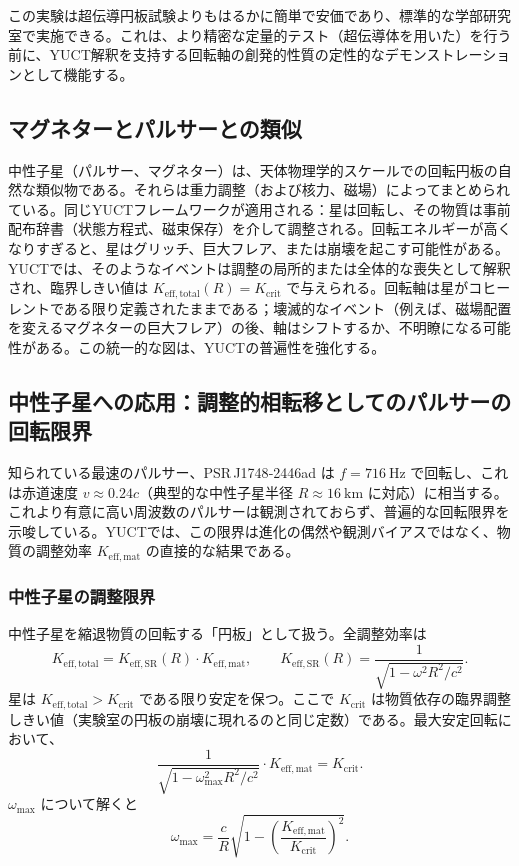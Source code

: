 \documentclass[12pt,a4paper]{article}
\newcommand{\Kefftot}{K_{\mathrm{eff,total}}}
\newcommand{\Kcrit}{K_{\mathrm{crit}}}
\begin{document}
	この実験は超伝導円板試験よりもはるかに簡単で安価であり、標準的な学部研究室で実施できる。これは、より精密な定量的テスト（超伝導体を用いた）を行う前に、YUCT解釈を支持する回転軸の創発的性質の定性的なデモンストレーションとして機能する。
	
	\subsection{マグネターとパルサーとの類似}
	
	中性子星（パルサー、マグネター）は、天体物理学的スケールでの回転円板の自然な類似物である。それらは重力調整（および核力、磁場）によってまとめられている。同じYUCTフレームワークが適用される：星は回転し、その物質は事前配布辞書（状態方程式、磁束保存）を介して調整される。回転エネルギーが高くなりすぎると、星はグリッチ、巨大フレア、または崩壊を起こす可能性がある。YUCTでは、そのようなイベントは調整の局所的または全体的な喪失として解釈され、臨界しきい値は \(\Kefftot(R) = \Kcrit\) で与えられる。回転軸は星がコヒーレントである限り定義されたままである；壊滅的なイベント（例えば、磁場配置を変えるマグネターの巨大フレア）の後、軸はシフトするか、不明瞭になる可能性がある。この統一的な図は、YUCTの普遍性を強化する。
	
	\subsection{中性子星への応用：調整的相転移としてのパルサーの回転限界}
	
	知られている最速のパルサー、PSR J1748‑2446ad は \(f = 716\ \text{Hz}\) で回転し、これは赤道速度 \(v \approx 0.24c\)（典型的な中性子星半径 \(R\approx 16\ \text{km}\) に対応）に相当する。これより有意に高い周波数のパルサーは観測されておらず、普遍的な回転限界を示唆している。YUCTでは、この限界は進化の偶然や観測バイアスではなく、物質の調整効率 \(K_{\mathrm{eff,mat}}\) の直接的な結果である。
	
	\subsubsection{中性子星の調整限界}
	
	中性子星を縮退物質の回転する「円板」として扱う。全調整効率は
	\[
	K_{\mathrm{eff,total}} = K_{\mathrm{eff,SR}}(R) \cdot K_{\mathrm{eff,mat}},
	\qquad
	K_{\mathrm{eff,SR}}(R) = \frac{1}{\sqrt{1 - \omega^2 R^2/c^2}}.
	\]
	星は \(K_{\mathrm{eff,total}} > K_{\mathrm{crit}}\) である限り安定を保つ。ここで \(K_{\mathrm{crit}}\) は物質依存の臨界調整しきい値（実験室の円板の崩壊に現れるのと同じ定数）である。最大安定回転において、
	\[
	\frac{1}{\sqrt{1 - \omega_{\max}^2 R^2/c^2}} \cdot K_{\mathrm{eff,mat}} = K_{\mathrm{crit}}.
	\]
	\(\omega_{\max}\) について解くと
	\[
	\omega_{\max} = \frac{c}{R}\sqrt{1 - \left(\frac{K_{\mathrm{eff,mat}}}{K_{\mathrm{crit}}}\right)^2}.
	\]
	
\end{document}
